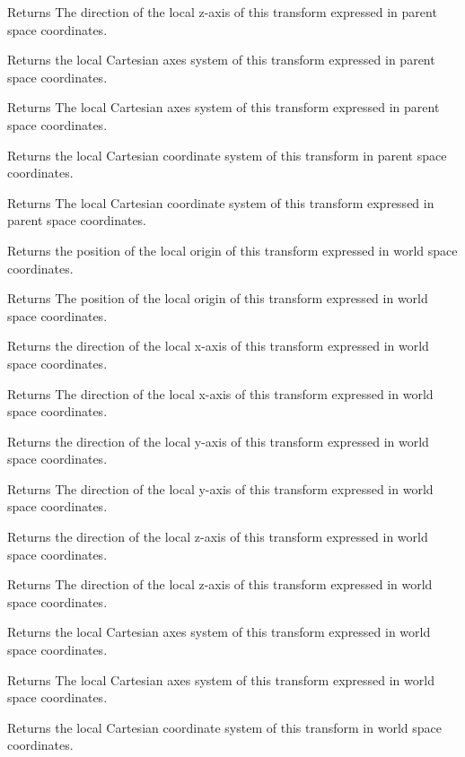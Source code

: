 \begin{DoxyReturn}{Returns}
The direction of the local z-\/axis of this transform expressed in parent space coordinates.
\end{DoxyReturn}
Returns the local Cartesian axes system of this transform expressed in parent space coordinates.

\begin{DoxyReturn}{Returns}
The local Cartesian axes system of this transform expressed in parent space coordinates.
\end{DoxyReturn}
Returns the local Cartesian coordinate system of this transform in parent space coordinates.

\begin{DoxyReturn}{Returns}
The local Cartesian coordinate system of this transform expressed in parent space coordinates.
\end{DoxyReturn}
Returns the position of the local origin of this transform expressed in world space coordinates.

\begin{DoxyReturn}{Returns}
The position of the local origin of this transform expressed in world space coordinates.
\end{DoxyReturn}
Returns the direction of the local x-\/axis of this transform expressed in world space coordinates.

\begin{DoxyReturn}{Returns}
The direction of the local x-\/axis of this transform expressed in world space coordinates.
\end{DoxyReturn}
Returns the direction of the local y-\/axis of this transform expressed in world space coordinates.

\begin{DoxyReturn}{Returns}
The direction of the local y-\/axis of this transform expressed in world space coordinates.
\end{DoxyReturn}
Returns the direction of the local z-\/axis of this transform expressed in world space coordinates.

\begin{DoxyReturn}{Returns}
The direction of the local z-\/axis of this transform expressed in world space coordinates.
\end{DoxyReturn}
Returns the local Cartesian axes system of this transform expressed in world space coordinates.

\begin{DoxyReturn}{Returns}
The local Cartesian axes system of this transform expressed in world space coordinates.
\end{DoxyReturn}
Returns the local Cartesian coordinate system of this transform in world space coordinates.

